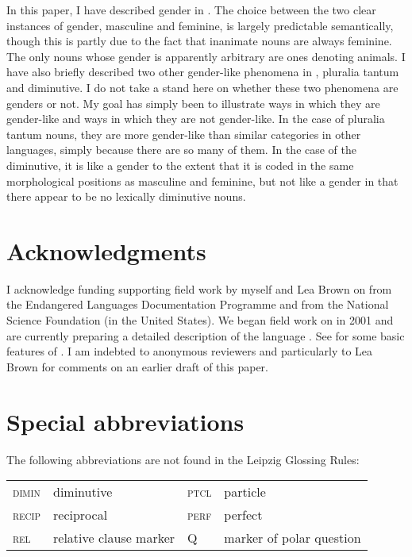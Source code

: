 \documentclass[output=collectionpaper]{langsci/langscibook}
\begin{document}
In this paper, I have described gender in . The choice between the two clear instances of gender, masculine and feminine, is largely predictable semantically, though this is partly due to the fact that inanimate nouns are always feminine. The only nouns whose gender is apparently arbitrary are ones denoting animals. I have also briefly described two other gender-like phenomena in , pluralia tantum and diminutive. I do not take a stand here on whether these two phenomena are genders or not. My goal has simply been to illustrate ways in which they are gender-like and ways in which they are not gender-like. In the case of pluralia tantum nouns, they are more gender-like than similar categories in other languages, simply because there are so many of them. In the case of the diminutive, it is like a gender to the extent that it is coded in the same morphological positions as masculine and feminine, but not like a gender in that there appear to be no lexically diminutive nouns.

\section*{Acknowledgments}
I acknowledge funding supporting field work by myself and Lea Brown on  from the Endangered Languages Documentation Programme and from the National Science Foundation (in the United States). We began field work on  in 2001 and are currently preparing a detailed description of the language \citep{DryerInpreparation}. See \citet{Brown2008} for some basic features of . I am indebted to anonymous reviewers and particularly to Lea Brown for comments on an earlier draft of this paper.

\section*{Special abbreviations}

\noindent The following abbreviations are not found in the Leipzig Glossing Rules:
\medskip

\begin{tabular}{llll}
 \textsc{dimin} & diminutive &   \textsc{ptcl} & particle\\
\textsc{recip} & reciprocal  & \textsc{perf} & perfect\\
\textsc{rel} & relative clause marker  &  Q & marker of polar question\\
\end{tabular}

\printbibliography[heading=subbibliography,notkeyword=this]
\end{document}
